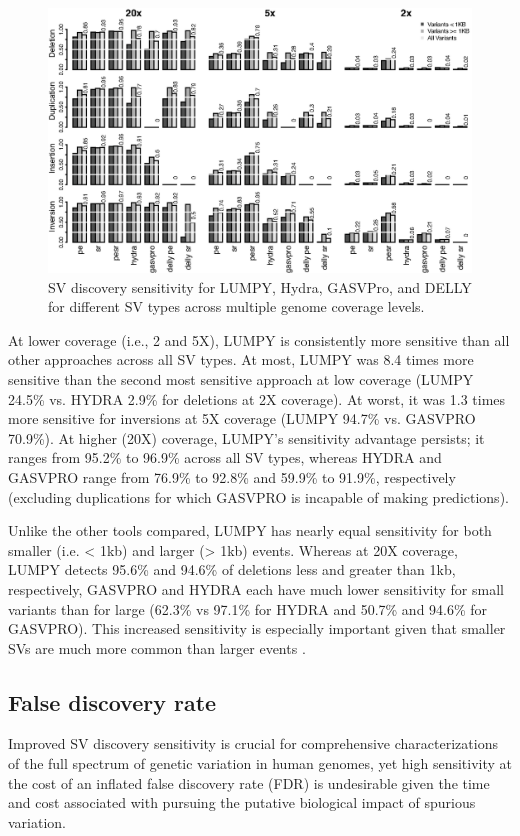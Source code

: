 \documentclass[11pt]{article}
\begin{document}
\begin{figure}
\includegraphics[width=6.5in]{R/ss_sl_s-un_hy_gv_dl-r10x.eps}
\caption{SV discovery sensitivity for LUMPY, Hydra, GASVPro, and DELLY for
different SV types across multiple genome coverage levels.}
\label{sensitivity:fig}
\end{figure}

At lower coverage (i.e., 2 and 5X), LUMPY is consistently more sensitive 
than all other approaches across all SV types. At most, LUMPY was 
8.4 times more sensitive than the second most sensitive approach at low 
coverage (LUMPY 24.5\% vs. HYDRA 2.9\% for deletions at 2X coverage). At worst, 
it was 1.3 times more sensitive for inversions at 5X coverage (LUMPY 94.7\% vs. 
GASVPRO 70.9\%). At higher (20X) coverage, 
LUMPY's sensitivity advantage persists; it ranges from 95.2\% to 96.9\% 
across all SV types, whereas HYDRA and GASVPRO range from 76.9\% to 92.8\% and
59.9\% to 91.9\%, respectively (excluding duplications for which GASVPRO is
incapable of making predictions).

Unlike the other tools compared, LUMPY has nearly equal sensitivity for 
both smaller (i.e. < 1kb) and larger (> 1kb) events. Whereas at 20X coverage,
LUMPY detects 95.6\% and 94.6\% of deletions less and greater than 1kb, 
respectively, GASVPRO and HYDRA each have much lower sensitivity for small
variants than for large (62.3\% vs 97.1\% for HYDRA and 50.7\% and 94.6\% for
GASVPRO). This increased sensitivity is especially important given that smaller
SVs are much more common than larger events \cite{mills2011}.


\subsection{False discovery rate}
Improved SV discovery sensitivity is crucial for comprehensive characterizations
of the full spectrum of genetic variation in human genomes, yet high
sensitivity at the cost of an inflated false discovery rate (FDR) is
undesirable given the time and cost associated with pursuing the putative 
biological impact of spurious variation.
\end{document}
